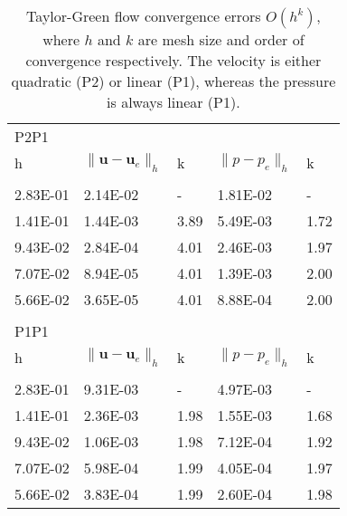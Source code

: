 \documentclass[final,3p,times,twocolumn]{elsarticle}
\begin{document}
\begin{table}[t!]
\caption{Taylor-Green flow convergence errors $O(h^k)$, where $h$ and $k$ are mesh size and order of convergence respectively. The velocity is either quadratic (P2) or linear (P1), whereas the pressure is always linear (P1).}
\label{tab:orderP2P21}
\begin{tabular}{p{4em} p{4em} p{2em} p{4em} p{2em}}
    \\
   P2P1 \\
\rule{0pt}{3ex}
   h & $\| \bm{u} -\bm{u}_e\|_h $ & k & $\| p-p_e \|_h $  & k  \\
   \hline \\
   2.83E-01 &   2.14E-02 & -  &   1.81E-02 & - \\
   1.41E-01 &   1.44E-03 & 3.89  &   5.49E-03 & 1.72 \\
   9.43E-02 &   2.84E-04 & 4.01  &   2.46E-03 & 1.97 \\
   7.07E-02 &   8.94E-05 & 4.01  &   1.39E-03 & 2.00 \\
   5.66E-02 &   3.65E-05 & 4.01  &   8.88E-04 & 2.00 \\
  \hline \\
  P1P1 \\
\rule{0pt}{3ex}
   h & $\| \bm{u} -\bm{u}_e\|_h $ & k & $\| p-p_e \|_h $  & k  \\
   \hline \\
     2.83E-01 &   9.31E-03 & -  &   4.97E-03 & - \\
   1.41E-01 &   2.36E-03 & 1.98  &   1.55E-03 & 1.68 \\
   9.43E-02 &   1.06E-03 & 1.98  &   7.12E-04 & 1.92 \\
   7.07E-02 &   5.98E-04 & 1.99  &   4.05E-04 & 1.97 \\
   5.66E-02 &   3.83E-04 & 1.99  &   2.60E-04 & 1.98 \\
   \hline
\end{tabular}
\end{table}
\end{document}
